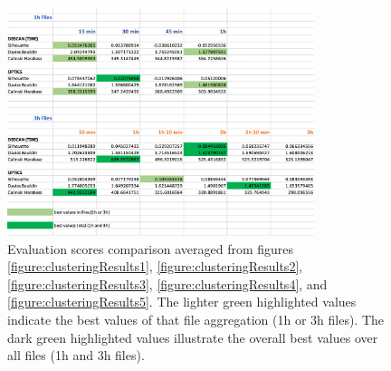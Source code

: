 \begin{figure}
  \centering
  \includegraphics[width=0.8\textwidth]{./images/clusteringResults/clusteringResults6.png}
  \caption{Evaluation scores comparison averaged from figures \ref{figure:clusteringResults1}, \ref{figure:clusteringResults2}, \ref{figure:clusteringResults3}, \ref{figure:clusteringResults4}, and \ref{figure:clusteringResults5}. The lighter green highlighted values indicate the best values of that file aggregation (1h or 3h files). The dark green highlighted values illustrate the overall best values over all files (1h and 3h files).}
  \label{figure:clusteringResults6}
\end{figure}




